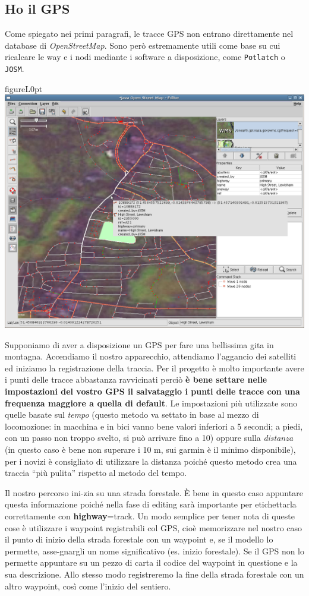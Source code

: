 \documentclass[a4paper,twoside,12pt,]{article}
\newcommand{\osm}{\emph{OpenStreetMap}\xspace}
\newcommand{\gps}{GPS\xspace}
\newcommand{\key}[1]{\textsf{\textbf{#1}}}
\newcommand{\val}[1]{\textsf{#1}}
\newcommand{\soft}[1]{\texttt{#1}}
\begin{document}
\subsection{Ho il \gps}
Come spiegato nei primi paragrafi, le tracce \gps non entrano direttamente nel database di \osm. Sono però estremamente utili come base su cui ricalcare le way e i nodi mediante i software a disposizione, come \soft{Potlatch} o \soft{JOSM}.
\begin{wrapfloat}{figure}{L}{0pt}
 \includegraphics[width=0.6\columnwidth]{Josm-screenshot.png}
 \caption{\textit{L'interfaccia di JOSM}}
\end{wrapfloat}
Supponiamo di aver a disposizione un \gps per fare una bellissima gita in montagna. Accendiamo il nostro apparecchio, attendiamo l'aggancio dei satelliti ed iniziamo la registrazione della traccia. Per il progetto è molto importante avere i punti delle tracce abbastanza ravvicinati perciò \textbf{è bene settare nelle impostazioni del vostro \gps il salvataggio i punti delle tracce con una frequenza maggiore a quella di default}. Le impostazioni più utilizzate sono quelle basate sul \textit{tempo} (questo metodo va settato in base al mezzo di locomozione: in macchina e in bici vanno bene valori inferiori a 5 secondi; a piedi, con un passo non troppo svelto, si può arrivare fino a 10) oppure sulla \textit{distanza} (in questo caso è bene non superare i 10 m, sui garmin è il minimo disponibile), per i novizi è consigliato di utilizzare la distanza poiché questo metodo crea una traccia ``più pulita'' rispetto al metodo del tempo.

Il nostro percorso ini-zia su una strada forestale. È bene in questo caso appuntare questa informazione poiché nella fase di editing sarà importante per etichettarla correttamente con \key{highway}=\val{track}. Un modo semplice per tener nota di queste cose è utilizzare i waypoint registrabili col \gps, cioè memorizzare nel nostro caso il punto di inizio della strada forestale con un waypoint e, se il modello lo permette, asse-gnargli un nome significativo (es. inizio forestale). Se il \gps non lo permette appuntare su un pezzo di carta il codice del waypoint in questione e la sua descrizione. Allo stesso modo registreremo la fine della strada forestale con un altro waypoint, così come l'inizio del sentiero.
\end{document}
